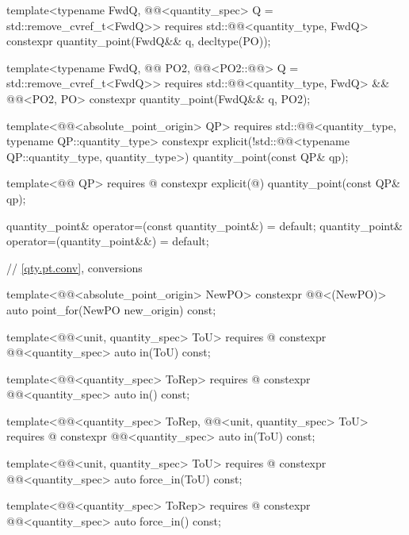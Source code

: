 \begin{codeblock}
{{  template<typename FwdQ, @@<quantity_spec> Q = std::remove_cvref_t<FwdQ>>
    requires std::@@<quantity_type, FwdQ>
  constexpr quantity_point(FwdQ&& q, decltype(PO));

  template<typename FwdQ, @@ PO2,
           @@<PO2::@@> Q = std::remove_cvref_t<FwdQ>>
    requires std::@@<quantity_type, FwdQ> && @@<PO2, PO>
  constexpr quantity_point(FwdQ&& q, PO2);

  template<@@<absolute_point_origin> QP>
    requires std::@@<quantity_type, typename QP::quantity_type>
  constexpr explicit(!std::@@<typename QP::quantity_type, quantity_type>)
    quantity_point(const QP& qp);

  template<@@ QP>
    requires @\seebelownc@
  constexpr explicit(@\seebelownc@) quantity_point(const QP& qp);

  quantity_point& operator=(const quantity_point&) = default;
  quantity_point& operator=(quantity_point&&) = default;

  // \ref{qty.pt.conv}, conversions

  template<@@<absolute_point_origin> NewPO>
  constexpr @@<(NewPO{})> auto point_for(NewPO new_origin) const;

  template<@@<unit, quantity_spec> ToU>
    requires @\seebelownc@
  constexpr @@<quantity_spec> auto in(ToU) const;

  template<@@<quantity_spec> ToRep>
    requires @\seebelownc@
  constexpr @@<quantity_spec> auto in() const;

  template<@@<quantity_spec> ToRep,
           @@<unit, quantity_spec> ToU>
    requires @\seebelownc@
  constexpr @@<quantity_spec> auto in(ToU) const;

  template<@@<unit, quantity_spec> ToU>
    requires @\seebelownc@
  constexpr @@<quantity_spec> auto force_in(ToU) const;

  template<@@<quantity_spec> ToRep>
    requires @\seebelownc@
  constexpr @@<quantity_spec> auto force_in() const;

}}
\end{codeblock}
